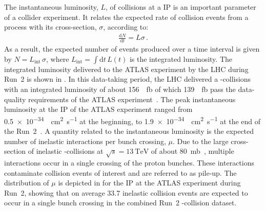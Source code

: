 The instantaneous luminosity, $L$, of collisions at a IP is an important
parameter of a collider experiment. It relates the expected rate of collision
events from a process with its cross-section, $\sigma$, according to:
\begin{align*}
  \frac{\mathrm{d}N}{\mathrm{d}t} = L \sigma \,\text{.}
\end{align*}
As a result, the expected number of events produced over a time interval is
given by $N = L_{\text{int}} \, \sigma$, where
$L_{\text{int}} = \int \mathrm{d}t \, L(t)$ is the integrated luminosity. The
integrated luminosity delivered to the ATLAS experiment by the LHC during Run~2
is shown in . In this data-taking period, the
LHC delivered a \pp-collisions with an integrated luminosity of about
\SI{156}{\per\femto\barn} of which \SI{139}{\per\femto\barn} pass the
data-quality requirements of the ATLAS experiment~\cite{ATLAS-CONF-2019-021}.
The peak instantaneous luminosity at the IP of the ATLAS experiment ranged from
\SI{0.5e-34}{\per\centi\metre\squared\per\second} at the beginning, to
\SI{1.9e-34}{\per\centi\metre\squared\per\second} at the end of the
Run~2~\cite{ATLAS-CONF-2019-021}. A quantity related to the instantaneous
luminosity is the expected number of inelastic \pp interactions per bunch
crossing, $\mu$. Due to the large cross-section of inelastic \pp-collisions at
$\sqrt{s} = \SI{13}{\TeV}$ of about \SI{80}{\milli\barn}~\cite{STDM-2015-05},
multiple interactions occur in a single crossing of the proton bunches. These
interactions contaminate collision events of interest and are referred to as
pile-up. The distribution of $\mu$ is depicted in  for the IP
at the ATLAS experiment during Run~2, showing that on average \num{33.7}
inelastic collision events are expected to occur in a single bunch crossing in
the combined Run~2 \pp-collision dataset.


